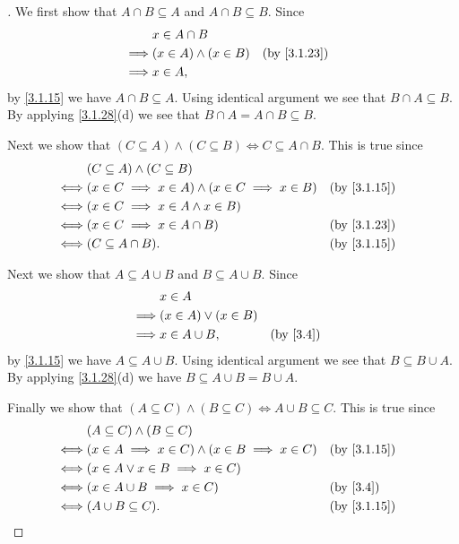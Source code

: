\begin{proof}[]
  We first show that \(A \cap B \subseteq A\) and \(A \cap B \subseteq B\).
  Since
  \begin{align*}
             & x \in A \cap B                             \\
    \implies & (x \in A) \land (x \in B) &  & \by{3.1.23} \\
    \implies & x \in A,
  \end{align*}
  by \cref{3.1.15} we have \(A \cap B \subseteq A\).
  Using identical argument we see that \(B \cap A \subseteq B\).
  By applying \cref{3.1.28}(d) we see that \(B \cap A = A \cap B \subseteq B\).

  Next we show that \((C \subseteq A) \land (C \subseteq B) \iff C \subseteq A \cap B\).
  This is true since
  \begin{align*}
         & (C \subseteq A) \land (C \subseteq B)                                        \\
    \iff & (x \in C \implies x \in A) \land (x \in C \implies x \in B) &  & \by{3.1.15} \\
    \iff & (x \in C \implies x \in A \land x \in B)                                     \\
    \iff & (x \in C \implies x \in A \cap B)                           &  & \by{3.1.23} \\
    \iff & (C \subseteq A \cap B).                                     &  & \by{3.1.15}
  \end{align*}

  Next we show that \(A \subseteq A \cup B\) and \(B \subseteq A \cup B\).
  Since
  \begin{align*}
             & x \in A                                \\
    \implies & (x \in A) \lor (x \in B)               \\
    \implies & x \in A \cup B,          &  & \by{3.4}
  \end{align*}
  by \cref{3.1.15} we have \(A \subseteq A \cup B\).
  Using identical argument we see that \(B \subseteq B \cup A\).
  By applying \cref{3.1.28}(d) we have \(B \subseteq A \cup B = B \cup A\).

  Finally we show that \((A \subseteq C) \land (B \subseteq C) \iff A \cup B \subseteq C\).
  This is true since
  \begin{align*}
         & (A \subseteq C) \land (B \subseteq C)                                        \\
    \iff & (x \in A \implies x \in C) \land (x \in B \implies x \in C) &  & \by{3.1.15} \\
    \iff & (x \in A \lor x \in B \implies x \in C)                                      \\
    \iff & (x \in A \cup B \implies x \in C)                           &  & \by{3.4}    \\
    \iff & (A \cup B \subseteq C).                                     &  & \by{3.1.15}
  \end{align*}
\end{proof}

